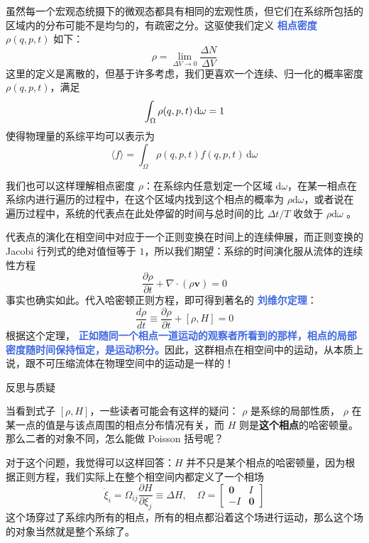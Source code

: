 \documentclass[hyperref,UTF-8]{ctexart}
\newcommand{\0}{\boldsymbol{0}}
\begin{document}
虽然每一个宏观态统摄下的微观态都具有相同的宏观性质，但它们在系综所包括的区域内的分布可能不是均匀的，有疏密之分。这驱使我们定义 \textcolor{RoyalBlue}{\textbf{\kaishu 相点密度}} $\rho(q,p,t)$ 如下：
\begin{equation}
    \rho = \lim_{\Delta V\rightarrow 0} \frac{\Delta N}{\Delta V} 
\end{equation}
这里的定义是离散的，但基于许多考虑，我们更喜欢一个连续、归一化的概率密度 $\rho(q,p,t)$，满足
\begin{equation}
    \int_\Omega \rho(q,p,t)\,\mathrm{d}\omega = 1 \\
\end{equation}
使得物理量的系综平均可以表示为
\begin{equation}
    \langle f \rangle =  \int_\Omega \rho(q,p,t)f(q,p,t)\,\mathrm{d}\omega
\end{equation}

我们也可以这样理解相点密度 $\rho$：在系综内任意划定一个区域 $\mathrm{d} \omega$，在某一相点在系综内进行遍历的过程中，在这个区域内找到这个相点的概率为 $\rho \mathrm{d} \omega$，或者说在遍历过程中，系统的代表点在此处停留的时间与总时间的比 $\Delta t / T$  收敛于 $\rho \mathrm{d} \omega$ 。

代表点的演化在相空间中对应于一个正则变换在时间上的连续伸展\cite{liang}，而正则变换的Jacobi 行列式的绝对值恒等于 $1$，所以我们期望：系综的时间演化服从流体的连续性方程
\begin{equation}
    \frac{\partial \rho}{\partial t} + \nabla \cdot (\rho \bm{v}) = 0
\end{equation}
事实也确实如此。代入哈密顿正则方程，即可得到著名的 \textcolor{RoyalBlue}{\textbf{\kaishu 刘维尔定理}}：
\begin{equation}
    \frac{d \rho}{dt} \equiv \frac{\partial \rho}{\partial t} + [\rho ,H] = 0
\end{equation}
根据这个定理， \textcolor{RoyalBlue}{\textbf{\kaishu 正如随同一个相点一道运动的观察者所看到的那样，相点的局部密度随时间保持恒定，是运动积分。}}因此，这群相点在相空间中的运动，从本质上说，跟不可压缩流体在物理空间中的运动是一样的！

\begin{justification}{\kaishu 反思与质疑}
    \kaishu \fontsize{11pt}{16pt}
    
    \quad\quad 当看到式子 $[\rho , H]$，一些读者可能会有这样的疑问： $\rho$ 是系综的局部性质， $\rho$ 在某一点的值是与该点周围的相点分布情况有关，而 $H$ 则是\textbf{这个相点}的哈密顿量。那么二者的对象不同，怎么能做 Poisson 括号呢？
    
    \quad\quad 对于这个问题，我觉得可以这样回答：$H$ 并不只是某个相点的哈密顿量，因为根据正则方程，我们实际上在整个相空间内都定义了一个相场\cite{pan}
    \[
        \dot\xi_i = \Omega_{ij}\frac{\partial H}{\partial \xi_j} \equiv \Delta H,\quad \Omega =
        \begin{bmatrix}
            \bm{0} & I\\
            -I& \bm{0}
        \end{bmatrix}
    \]
    这个场穿过了系综内所有的相点，所有的相点都沿着这个场进行运动，那么这个场的对象当然就是整个系综了。
    \end{justification}
\end{document}
